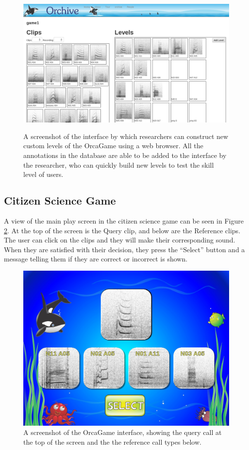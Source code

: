 \documentclass[12pt,oneside]{book}
\begin{document}
\begin{figure}[t]
\centering
\includegraphics[width=\columnwidth]{figures/orchiveV2gameBuilder}
\label{fig:orchiveV2gameBuilder}
\caption{A screenshot of the interface by which researchers can
  construct new custom levels of the OrcaGame using a web browser.
  All the annotations in the database are able to be added to the
  interface by the researcher, who can quickly build new levels to
  test the skill level of users.}
\end{figure}

\subsection{Citizen Science Game}

A view of the main play screen in the citizen science game can be seen
in Figure \ref{fig:OrcaGame}.  At the top of the screen is the Query
clip, and below are the Reference clips.  The user can click on the
clips and they will make their corresponding sound.  When they are
satisfied with their decision, they press the ``Select'' button and a
message telling them if they are correct or incorrect is shown.

\begin{figure}[h]
\centering
\includegraphics[width=\columnwidth]{figures/orcagame}
\caption{A screenshot of the OrcaGame interface, showing the query
  call at the top of the screen and the the reference call types below.}
\label{fig:OrcaGame}
\end{figure}
\end{document}
